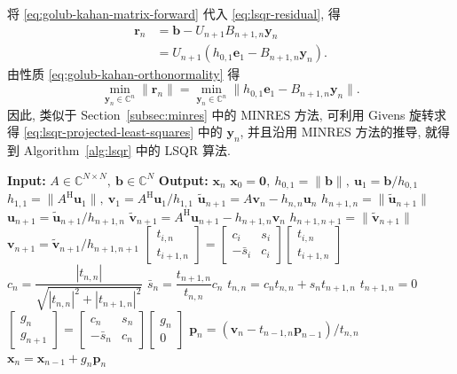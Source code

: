 {将 \eqref{eq:golub-kahan-matrix-forward} 代入 \eqref{eq:lsqr-residual}, 得}
\[\begin{aligned}\bm r_n&=\bm b-U_{n+1}B_{n+1,n}\bm y_n\\&=U_{n+1}(h_{0,1}\bm e_1-B_{n+1,n}\bm y_n).\end{aligned}\]
{由性质 \eqref{eq:golub-kahan-orthonormality} 得}
\begin{equation}\label{eq:lsqr-projected-least-squares}\min_{\bm y_n\in\mathbb C^n}\|\bm r_n\|=\min_{\bm y_n\in\mathbb C^n}\|h_{0,1}\bm e_1-B_{n+1,n}\bm y_n\|.\end{equation}
{因此, 类似于 Section\ \ref{subsec:minres} 中的 MINRES 方法, 可利用 Givens 旋转求得 \eqref{eq:lsqr-projected-least-squares} 中的 $\bm y_n$, 并且沿用 MINRES 方法的推导, 就得到 Algorithm\ \ref{alg:lsqr} 中的 LSQR 算法.}
\begin{algorithm}[H]\caption{{LSQR 方法}}\label{alg:lsqr}\begin{algorithmic}[1]
\Statex\textbf{Input:} $A\in\mathbb C^{N\times N},\ \bm b\in\mathbb C^N$
\Statex\textbf{Output:} $\bm x_n$
\State $\bm x_0=\bm0,\ h_{0,1}=\|\bm b\|,\ \bm u_1=\bm b/h_{0,1}$
\State $h_{1,1}=\|A^{\mathrm H}\bm u_1\|,\ \bm v_1=A^{\mathrm H}\bm u_1/h_{1,1}$
\State $\widetilde{\bm u}_{n+1}=A\bm v_n-h_{n,n}\bm u_n$
\State $h_{n+1,n}=\|\widetilde{\bm u}_{n+1}\|$
\State $\bm u_{n+1}=\widetilde{\bm u}_{n+1}/h_{n+1,n}$
\State $\widetilde{\bm v}_{n+1}=A^{\mathrm H}\bm u_{n+1}-h_{n+1,n}\bm v_n$
\State $h_{n+1,n+1}=\|\widetilde{\bm v}_{n+1}\|$
\State $\bm v_{n+1}=\widetilde{\bm v}_{n+1}/h_{n+1,n+1}$
\State $\begin{bmatrix}t_{i,n}\\t_{i+1,n}\end{bmatrix}=\begin{bmatrix}c_i&s_i\\-\bar s_i&c_i\end{bmatrix}\begin{bmatrix}t_{i,n}\\t_{i+1,n}\end{bmatrix}$
\EndFor
\State $c_n=\dfrac{|t_{n,n}|}{\sqrt{|t_{n,n}|^2+|t_{n+1,n}|^2}}$
\State $\bar s_n=\dfrac{t_{n+1,n}}{t_{n,n}}c_n$
\State $t_{n,n}=c_nt_{n,n}+s_nt_{n+1,n}$
\State $t_{n+1,n}=0$
\State $\begin{bmatrix}g_n\\g_{n+1}\end{bmatrix}=\begin{bmatrix}c_n&s_n\\-\bar s_n&c_n\end{bmatrix}\begin{bmatrix}g_n\\0\end{bmatrix}$
\State $\bm p_n=(\bm v_n-t_{n-1,n}\bm p_{n-1})/t_{n,n}$
\State $\bm x_n=\bm x_{n-1}+g_n\bm p_n$
\EndFor\end{algorithmic}\end{algorithm}
